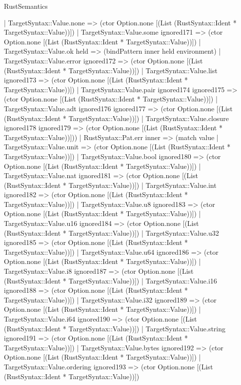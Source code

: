\begin{lexlean}{RustSemantics}
\begin{semanticmodule}
{      | TargetSyntax::Value.none => (ctor Option.none [(List (RustSyntax::Ident * TargetSyntax::Value))])
      | TargetSyntax::Value.some ignored171 => (ctor Option.none [(List (RustSyntax::Ident * TargetSyntax::Value))])
      | TargetSyntax::Value.ok held => (bindPattern inner held environment)
      | TargetSyntax::Value.error ignored172 => (ctor Option.none [(List (RustSyntax::Ident * TargetSyntax::Value))])
      | TargetSyntax::Value.list ignored173 => (ctor Option.none [(List (RustSyntax::Ident * TargetSyntax::Value))])
      | TargetSyntax::Value.pair ignored174 ignored175 => (ctor Option.none [(List (RustSyntax::Ident * TargetSyntax::Value))])
      | TargetSyntax::Value.adt ignored176 ignored177 => (ctor Option.none [(List (RustSyntax::Ident * TargetSyntax::Value))])
      | TargetSyntax::Value.closure ignored178 ignored179 => (ctor Option.none [(List (RustSyntax::Ident * TargetSyntax::Value))]))
    | RustSyntax::Pat.err inner => (match value
      | TargetSyntax::Value.unit => (ctor Option.none [(List (RustSyntax::Ident * TargetSyntax::Value))])
      | TargetSyntax::Value.bool ignored180 => (ctor Option.none [(List (RustSyntax::Ident * TargetSyntax::Value))])
      | TargetSyntax::Value.nat ignored181 => (ctor Option.none [(List (RustSyntax::Ident * TargetSyntax::Value))])
      | TargetSyntax::Value.int ignored182 => (ctor Option.none [(List (RustSyntax::Ident * TargetSyntax::Value))])
      | TargetSyntax::Value.u8 ignored183 => (ctor Option.none [(List (RustSyntax::Ident * TargetSyntax::Value))])
      | TargetSyntax::Value.u16 ignored184 => (ctor Option.none [(List (RustSyntax::Ident * TargetSyntax::Value))])
      | TargetSyntax::Value.u32 ignored185 => (ctor Option.none [(List (RustSyntax::Ident * TargetSyntax::Value))])
      | TargetSyntax::Value.u64 ignored186 => (ctor Option.none [(List (RustSyntax::Ident * TargetSyntax::Value))])
      | TargetSyntax::Value.i8 ignored187 => (ctor Option.none [(List (RustSyntax::Ident * TargetSyntax::Value))])
      | TargetSyntax::Value.i16 ignored188 => (ctor Option.none [(List (RustSyntax::Ident * TargetSyntax::Value))])
      | TargetSyntax::Value.i32 ignored189 => (ctor Option.none [(List (RustSyntax::Ident * TargetSyntax::Value))])
      | TargetSyntax::Value.i64 ignored190 => (ctor Option.none [(List (RustSyntax::Ident * TargetSyntax::Value))])
      | TargetSyntax::Value.string ignored191 => (ctor Option.none [(List (RustSyntax::Ident * TargetSyntax::Value))])
      | TargetSyntax::Value.bytes ignored192 => (ctor Option.none [(List (RustSyntax::Ident * TargetSyntax::Value))])
      | TargetSyntax::Value.ordering ignored193 => (ctor Option.none [(List (RustSyntax::Ident * TargetSyntax::Value))])
}
\end{semanticmodule}
\end{lexlean}
